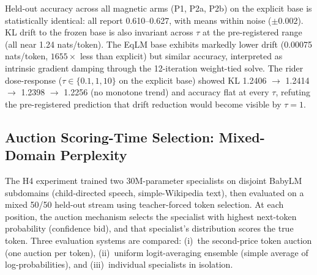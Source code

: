 Held-out accuracy across all magnetic arms (P1, P2a, P2b) on the explicit base is statistically identical: all report 0.610--0.627, with means within noise ($\pm 0.002$). KL drift to the frozen base is also invariant across $\tau$ at the pre-registered range (all near 1.24 nats/token). The EqLM base exhibits markedly lower drift (0.00075 nats/token, $1655\times$ less than explicit) but similar accuracy, interpreted as intrinsic gradient damping through the 12-iteration weight-tied solve. The rider dose-response ($\tau \in \{0.1, 1, 10\}$ on the explicit base) showed KL 1.2406 $\to$ 1.2414 $\to$ 1.2398 $\to$ 1.2256 (no monotone trend) and accuracy flat at every $\tau$, refuting the pre-registered prediction that drift reduction would become visible by $\tau = 1$.

\subsection{Auction Scoring-Time Selection: Mixed-Domain Perplexity}

The H4 experiment trained two 30M-parameter specialists on disjoint BabyLM subdomains (child-directed speech, simple-Wikipedia text), then evaluated on a mixed 50/50 held-out stream using teacher-forced token selection. At each position, the auction mechanism selects the specialist with highest next-token probability (confidence bid), and that specialist's distribution scores the true token. Three evaluation systems are compared: (i)~the second-price token auction (one auction per token), (ii)~uniform logit-averaging ensemble (simple average of log-probabilities), and (iii)~individual specialists in isolation.

\begin{table}[h]
\centering
\small
\caption{H4 auction scoring-time selection (F22): teacher-forced mixed-domain perplexity (lower is better). Auction selects the highest-confidence specialist at each token; ensemble averages logits uniformly; best/worst single specialists in isolation. Means and per-seed values shown.}
\label{tab:auction_scoring}
\end{table}

